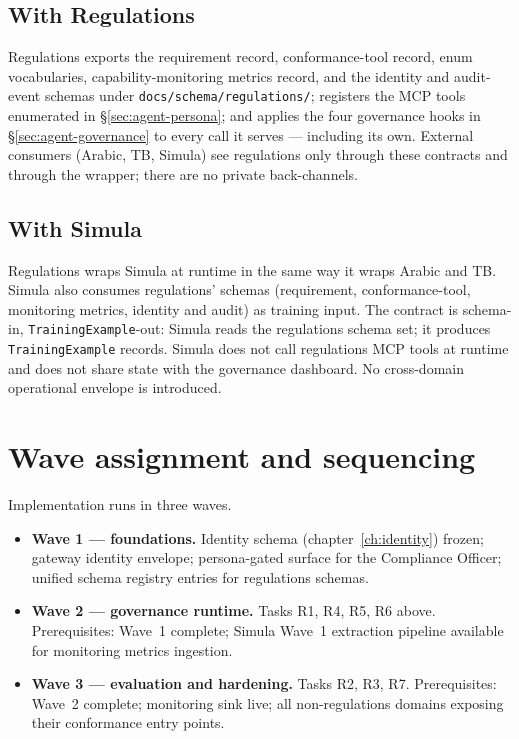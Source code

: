 \subsection{With Regulations}
Regulations exports the requirement record, conformance-tool record,
enum vocabularies, capability-monitoring metrics record, and the
identity and audit-event schemas under \texttt{docs/schema/regulations/};
registers the MCP tools enumerated in \S\ref{sec:agent-persona};
and applies the four governance hooks in
\S\ref{sec:agent-governance} to every call it serves --- including
its own. External consumers (Arabic, TB, Simula) see regulations
only through these contracts and through the wrapper; there are no
private back-channels.

\subsection{With Simula}
Regulations wraps Simula at runtime in the same way it wraps Arabic
and TB. Simula also consumes regulations' schemas (requirement,
conformance-tool, monitoring metrics, identity and audit) as
training input. The contract is schema-in,
\texttt{TrainingExample}-out: Simula reads the regulations schema
set; it produces \texttt{TrainingExample} records. Simula does not
call regulations MCP tools at runtime and does not share state with
the governance dashboard. No cross-domain operational envelope is
introduced.

\section{Wave assignment and sequencing}
\label{sec:agent-waves}
Implementation runs in three waves.

\begin{itemize}
  \item \textbf{Wave 1 --- foundations.} Identity schema
    (chapter~\ref{ch:identity}) frozen; gateway identity envelope;
    persona-gated surface for the Compliance Officer; unified schema
    registry entries for regulations schemas.
  \item \textbf{Wave 2 --- governance runtime.} Tasks R1, R4, R5, R6
    above. Prerequisites: Wave~1 complete; Simula Wave~1 extraction
    pipeline available for monitoring metrics ingestion.
  \item \textbf{Wave 3 --- evaluation and hardening.} Tasks R2, R3,
    R7. Prerequisites: Wave~2 complete; monitoring sink live; all
    non-regulations domains exposing their conformance entry
    points.
\end{itemize}

